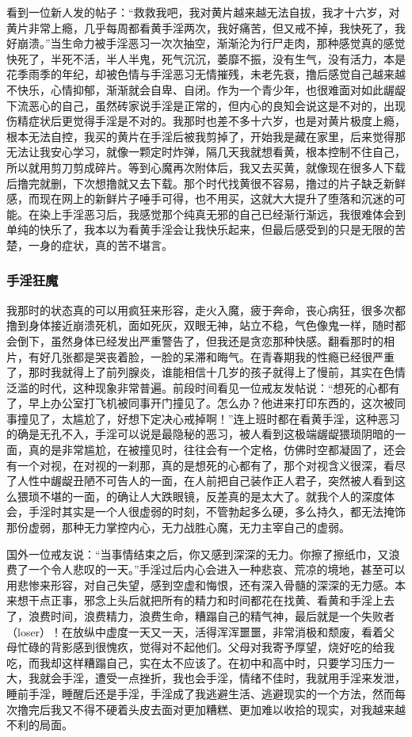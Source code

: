 看到一位新人发的帖子：“救救我吧，我对黄片越来越无法自拔，我才十六岁，对黄片非常上瘾，几乎每周都看黄手淫两次，我好痛苦，但又戒不掉，我快死了，我好崩溃。”当生命力被手淫恶习一次次抽空，渐渐沦为行尸走肉，那种感觉真的感觉快死了，半死不活，半人半鬼，死气沉沉，萎靡不振，没有生气，没有活力，本是花季雨季的年纪，却被色情与手淫恶习无情摧残，未老先衰，撸后感觉自己越来越不快乐，心情抑郁，渐渐就会自卑、自闭。作为一个青少年，也很难面对如此龌龊下流恶心的自己，虽然砖家说手淫是正常的，但内心的良知会说这是不对的，出现伤精症状后更觉得手淫是不对的。我那时也差不多十六岁，也是对黄片极度上瘾，根本无法自控，我买的黄片在手淫后被我剪掉了，开始我是藏在家里，后来觉得那无法让我安心学习，就像一颗定时炸弹，隔几天我就想看黄，根本控制不住自己，所以就用剪刀剪成碎片。等到心魔再次附体后，我又去买黄，就像现在很多人下载后撸完就删，下次想撸就又去下载。那个时代找黄很不容易，撸过的片子缺乏新鲜感，而现在网上的新鲜片子唾手可得，也不用买，这就大大提升了堕落和沉迷的可能。在染上手淫恶习后，我感觉那个纯真无邪的自己已经渐行渐远，我很难体会到单纯的快乐了，我本以为看黄手淫会让我快乐起来，但最后感受到的只是无限的苦楚，一身的症状，真的苦不堪言。

\subsubsection{手淫狂魔}

我那时的状态真的可以用疯狂来形容，走火入魔，疲于奔命，丧心病狂，很多次都撸到身体接近崩溃死机，面如死灰，双眼无神，站立不稳，气色像鬼一样，随时都会倒下，虽然身体已经发出严重警告了，但我还是贪恋那种快感。翻看那时的相片，有好几张都是哭丧着脸，一脸的呆滞和晦气。在青春期我的性瘾已经很严重了，那时我就得上了前列腺炎，谁能相信十几岁的孩子就得上了慢前，其实在色情泛滥的时代，这种现象非常普遍。前段时间看见一位戒友发帖说：“想死的心都有了，早上办公室打飞机被同事开门撞见了。怎么办？他进来打印东西的，这次被同事撞见了，太尴尬了，好想下定决心戒掉啊！”连上班时都在看黄手淫，这种恶习的确是无孔不入，手淫可以说是最隐秘的恶习，被人看到这极端龌龊猥琐阴暗的一面，真的是非常尴尬，在被撞见时，往往会有一个定格，仿佛时空都凝固了，还会有一个对视，在对视的一刹那，真的是想死的心都有了，那个对视含义很深，看尽了人性中龌龊丑陋不可告人的一面，在人前把自己装作正人君子，突然被人看到这么猥琐不堪的一面，的确让人大跌眼镜，反差真的是太大了。就我个人的深度体会，手淫时其实是一个人很虚弱的时刻，不管勃起多么硬，多么持久，都无法掩饰那份虚弱，那种无力掌控内心，无力战胜心魔，无力主宰自己的虚弱。

国外一位戒友说：“当事情结束之后，你又感到深深的无力。你擦了擦纸巾，又浪费了一个令人悲叹的一天。”手淫过后内心会进入一种悲哀、荒凉的境地，甚至可以用悲惨来形容，对自己失望，感到空虚和悔恨，还有深入骨髓的深深的无力感。本来想干点正事，邪念上头后就把所有的精力和时间都花在找黄、看黄和手淫上去了，浪费时间，浪费精力，浪费生命，糟蹋自己的精气神，最后就是一个失败者（loser）！在放纵中虚度一天又一天，活得浑浑噩噩，非常消极和颓废，看着父母忙碌的背影感到很愧疚，觉得对不起他们。父母对我寄予厚望，烧好吃的给我吃，而我却这样糟蹋自己，实在太不应该了。在初中和高中时，只要学习压力一大，我就会手淫，遭受一点挫折，我也会手淫，情绪不佳时，我就用手淫来发泄，睡前手淫，睡醒后还是手淫，手淫成了我逃避生活、逃避现实的一个方法，然而每次撸完后我又不得不硬着头皮去面对更加糟糕、更加难以收拾的现实，对我越来越不利的局面。

